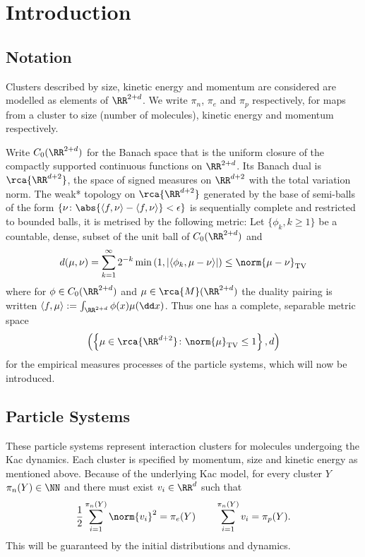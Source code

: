 \section{Introduction}

\subsection{Notation}
Clusters described by size, kinetic energy and momentum are considered are modelled as elements of $\RR^{2+d}$.
We write $\pi_n$, $\pi_e$ and $\pi_p$ respectively, for maps from a cluster to size (number of molecules), kinetic energy and momentum respectively.

Write $C_0(\RR^{2+d})$ for the Banach space that is the uniform closure of the compactly supported continuous functions on $\RR^{2+d}$.
Its Banach dual is $\rca{\RR^{d+2}}$, the space of signed measures on $\RR^{d+2}$ with the total variation norm.
The weak* topology on $\rca{\RR^{d+2}}$ generated by the base of semi-balls of the form
$\left\{\nu \colon \abs{\left<f,\nu\right> - \left<f,\nu\right>} < \epsilon \right\}$ is sequentially complete \cite[Corr 2.6.21]{Meg} and restricted to bounded balls, it is metrised by the following metric:  
Let $\{\phi_k, k\geq 1\}$ be a countable, dense, subset of the unit ball of $C_0(\RR^{2+d})$ and
\begin{equation} 
 d(\mu, \nu)=\sum_{k=1}^\infty 2^{-k} \min\left(1, |\langle \phi_k, \mu-\nu\rangle|\right)
 \leq \norm{\mu - \nu}_{\mathrm{TV}}
\end{equation}
where for $\phi\in C_0(\RR^{2+d})$ and $\mu \in \rca{M}(\RR^{2+d})$ the duality pairing is written $\left<f,\mu\right> := \int_{\RR^{2+d}} \phi(x) \mu(\dd x)$.
Thus one has a complete, separable metric space
\begin{equation}
 \left(\left\{\mu \in \rca{\RR^{d+2}} \colon \norm{\mu}_\mathrm{TV} \leq 1 \right\}, d\right)    
\end{equation}
for the empirical measures processes of the particle systems, which will now be introduced.




\subsection{Particle Systems}

These particle systems represent interaction clusters for molecules undergoing the Kac dynamics.
Each cluster is specified by momentum, size and kinetic energy as mentioned above.
Because of the underlying Kac model, for every cluster $Y$ $\pi_n(Y) \in \NN$ and there must exist $v_i \in \RR^d$ such that
\begin{equation}\label{eq:cluster-struct}
    \frac12 \sum_{i=1}^{\pi_n(Y)} \norm{v_i}^2 = \pi_e(Y)
    \qquad
    \sum_{i=1}^{\pi_n(Y)} v_i = \pi_p(Y).
\end{equation}
This will be guaranteed by the initial distributions and dynamics.

